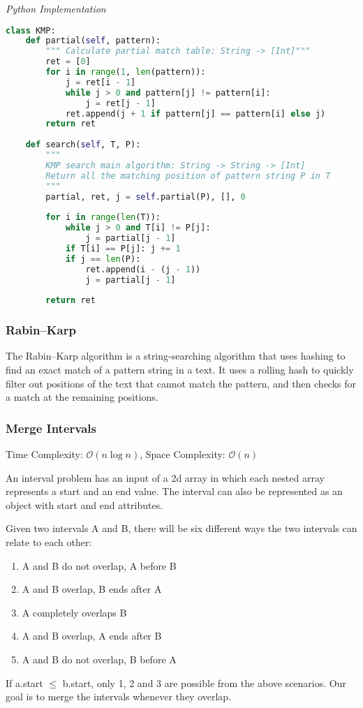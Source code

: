 \documentclass{article}
\newcommand{\bigO}{\ensuremath{\mathcal{O}}}
\begin{document}
\vspace{8pt} \emph{Python Implementation}
\begin{lstlisting}[language=Python]    
class KMP:
    def partial(self, pattern):
        """ Calculate partial match table: String -> [Int]"""
        ret = [0]
        for i in range(1, len(pattern)):
            j = ret[i - 1]
            while j > 0 and pattern[j] != pattern[i]:
                j = ret[j - 1]
            ret.append(j + 1 if pattern[j] == pattern[i] else j)
        return ret
        
    def search(self, T, P):
        """ 
        KMP search main algorithm: String -> String -> [Int] 
        Return all the matching position of pattern string P in T
        """
        partial, ret, j = self.partial(P), [], 0
        
        for i in range(len(T)):
            while j > 0 and T[i] != P[j]:
                j = partial[j - 1]
            if T[i] == P[j]: j += 1
            if j == len(P): 
                ret.append(i - (j - 1))
                j = partial[j - 1]
            
        return ret
\end{lstlisting}
    
    \subsubsection{Rabin–Karp}
    The Rabin–Karp algorithm is a string-searching algorithm that uses hashing to find an exact match of a pattern string in a text. It uses a rolling hash to quickly filter out positions of the text that cannot match the pattern, and then checks for a match at the remaining positions.
    
    \subsubsection{Merge Intervals}
    Time Complexity: $\bigO(n \log n)$, Space Complexity: $\bigO(n)$
    
    An interval problem has an input of a 2d array in which each nested array represents a start and an end value. The interval can also be represented as an object with start and end attributes.
    
    Given two intervals A and B, there will be six different ways the two intervals can relate to each other:
    \begin{enumerate}
        \item A and B do not overlap, A before B
        \item A and B overlap, B ends after A
        \item A completely overlaps B
        \item A and B overlap, A ends after B
        \item  A and B do not overlap, B before A
    \end{enumerate}
    If a.start $\leq$ b.start, only 1, 2 and 3 are possible from the above scenarios.  Our goal is to merge the intervals whenever they overlap.
    
\end{document}

